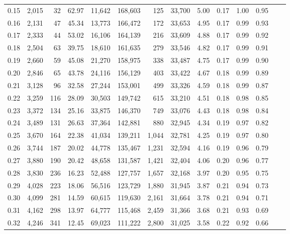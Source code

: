 \begin{tabular}{rrrrrrrrrrrrrr}
0.15 &  2,015 &   32 &   62.97 &   11,642 &  168,603 &     125 &  33,700 &  5.00 &  0.17 &  1.00 &      0.95 \\
0.16 &  2,131 &   47 &   45.34 &   13,773 &  166,472 &     172 &  33,653 &  4.95 &  0.17 &  0.99 &      0.93 \\
0.17 &  2,333 &   44 &   53.02 &   16,106 &  164,139 &     216 &  33,609 &  4.88 &  0.17 &  0.99 &      0.92 \\
0.18 &  2,504 &   63 &   39.75 &   18,610 &  161,635 &     279 &  33,546 &  4.82 &  0.17 &  0.99 &      0.91 \\
0.19 &  2,660 &   59 &   45.08 &   21,270 &  158,975 &     338 &  33,487 &  4.75 &  0.17 &  0.99 &      0.90 \\
0.20 &  2,846 &   65 &   43.78 &   24,116 &  156,129 &     403 &  33,422 &  4.67 &  0.18 &  0.99 &      0.89 \\
0.21 &  3,128 &   96 &   32.58 &   27,244 &  153,001 &     499 &  33,326 &  4.59 &  0.18 &  0.99 &      0.87 \\
0.22 &  3,259 &  116 &   28.09 &   30,503 &  149,742 &     615 &  33,210 &  4.51 &  0.18 &  0.98 &      0.85 \\
0.23 &  3,372 &  134 &   25.16 &   33,875 &  146,370 &     749 &  33,076 &  4.43 &  0.18 &  0.98 &      0.84 \\
0.24 &  3,489 &  131 &   26.63 &   37,364 &  142,881 &     880 &  32,945 &  4.34 &  0.19 &  0.97 &      0.82 \\
0.25 &  3,670 &  164 &   22.38 &   41,034 &  139,211 &   1,044 &  32,781 &  4.25 &  0.19 &  0.97 &      0.80 \\
0.26 &  3,744 &  187 &   20.02 &   44,778 &  135,467 &   1,231 &  32,594 &  4.16 &  0.19 &  0.96 &      0.79 \\
0.27 &  3,880 &  190 &   20.42 &   48,658 &  131,587 &   1,421 &  32,404 &  4.06 &  0.20 &  0.96 &      0.77 \\
0.28 &  3,830 &  236 &   16.23 &   52,488 &  127,757 &   1,657 &  32,168 &  3.97 &  0.20 &  0.95 &      0.75 \\
0.29 &  4,028 &  223 &   18.06 &   56,516 &  123,729 &   1,880 &  31,945 &  3.87 &  0.21 &  0.94 &      0.73 \\
0.30 &  4,099 &  281 &   14.59 &   60,615 &  119,630 &   2,161 &  31,664 &  3.78 &  0.21 &  0.94 &      0.71 \\
0.31 &  4,162 &  298 &   13.97 &   64,777 &  115,468 &   2,459 &  31,366 &  3.68 &  0.21 &  0.93 &      0.69 \\
0.32 &  4,246 &  341 &   12.45 &   69,023 &  111,222 &   2,800 &  31,025 &  3.58 &  0.22 &  0.92 &      0.66 \\

\end{tabular}
